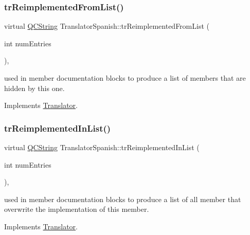 \subsubsection{\texorpdfstring{trReimplementedFromList()}{trReimplementedFromList()}}
{\footnotesize\ttfamily virtual \mbox{\hyperlink{class_q_c_string}{Q\+C\+String}} Translator\+Spanish\+::tr\+Reimplemented\+From\+List (\begin{DoxyParamCaption}\item[{int}]{num\+Entries }\end{DoxyParamCaption})\hspace{0.3cm}{\ttfamily [inline]}, {\ttfamily [virtual]}}

used in member documentation blocks to produce a list of members that are hidden by this one. 

Implements \mbox{\hyperlink{class_translator}{Translator}}.

\mbox{\label{class_translator_spanish_ab6bab90ae60f6a3486d9815d76f871a2}} 
\subsubsection{\texorpdfstring{trReimplementedInList()}{trReimplementedInList()}}
{\footnotesize\ttfamily virtual \mbox{\hyperlink{class_q_c_string}{Q\+C\+String}} Translator\+Spanish\+::tr\+Reimplemented\+In\+List (\begin{DoxyParamCaption}\item[{int}]{num\+Entries }\end{DoxyParamCaption})\hspace{0.3cm}{\ttfamily [inline]}, {\ttfamily [virtual]}}

used in member documentation blocks to produce a list of all member that overwrite the implementation of this member. 

Implements \mbox{\hyperlink{class_translator}{Translator}}.

\mbox{\label{class_translator_spanish_a8d478f987fb0fe78349ba87cab9deee5}} 

